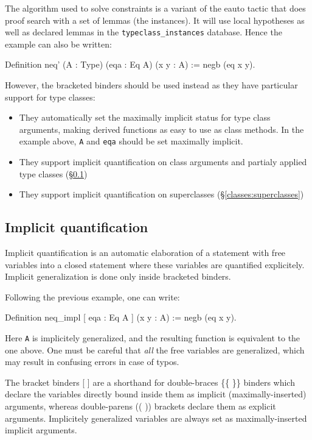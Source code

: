 The algorithm used to solve constraints is a variant of the eauto tactic
that does proof search with a set of lemmas (the instances). It will use
local hypotheses as well as declared lemmas in the
\texttt{typeclass\_instances} database. Hence the example can also be
written:

\begin{coq_example}
  Definition neq' (A : Type) (eqa : Eq A) (x y : A) := negb (eq x y).
\end{coq_example}

However, the bracketed binders should be used instead as they have
particular support for type classes:
\begin{itemize}
\item They automatically set the maximally implicit status for type
  class arguments, making derived functions as easy to use as class
  methods. In the example above, \texttt{A} and \texttt{eqa} should be
  set maximally implicit.
\item They support implicit quantification on class arguments and
  partialy applied type classes (\S \ref{classes:impl-quant})
\item They support implicit quantification on superclasses (\S \ref{classes:superclasses})
\end{itemize}

\subsection{Implicit quantification}
\label{classes:impl-quant}

Implicit quantification is an automatic elaboration of a statement with
free variables into a closed statement where these variables are
quantified explicitely. Implicit generalization is done only inside
bracketed binders.

Following the previous example, one can write:
\begin{coq_example}
  Definition neq_impl [ eqa : Eq A ] (x y : A) := negb (eq x y).
\end{coq_example}

Here \texttt{A} is implicitely generalized, and the resulting function
is equivalent to the one above. One must be careful that \emph{all} the
free variables are generalized, which may result in confusing errors in
case of typos. 

The bracket binders [ ] are a shorthand for double-braces \{\{ \}\} binders
which declare the variables directly bound inside them as implicit
(maximally-inserted) arguments, whereas double-parens (( )) brackets
declare them as explicit arguments. Implicitely generalized variables
are always set as maximally-inserted implicit arguments.

